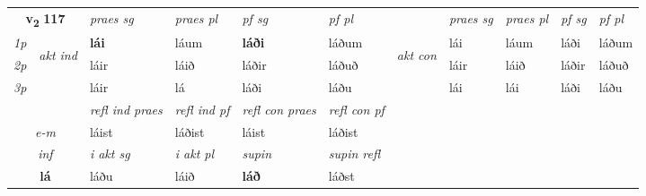 \noindent
\begin{tabular}{lllllllllll} \toprule
\multicolumn{2}{c}{\textbf{v{\textsubscript{2}}} \Large{\textbf{117}}}  &  \textit{praes sg}  & \textit{praes pl}  &\textit{ pf sg} & \textit{pf pl} &  &  \textit{praes sg}  & \textit{praes pl}  & \textit{pf sg} & \textit{pf pl } \\*
	\cmidrule{3-6} \cmidrule{8-11}
 {\textit{1p}} & \multirow{3}{*}{\begin{turn}{90}\textit{akt ind}\end{turn}} & \textbf{lái} & láum & \textbf{láði} & láðum & \multirow{3}{*}{\begin{turn}{90}\textit{akt con}\end{turn}} &lái & láum & láði & láðum\\*
 {\textit{2p}} &  &  láir  & láið & láðir & láðuð & & láir & láið & láðir & láðuð \\*
{\textit{3p}} &  & láir & lá & láði & láðu & & lái & lái& láði & láðu \\*
\cmidrule{3-6} \cmidrule{8-11}

 & & \textit{refl ind praes} & \textit{refl ind pf} & \textit{refl con praes} & \textit{refl con pf} \\*
 \multicolumn{2}{c}{ \textit{e-m} }& láist & láðist & láist & láðist \\*

\cmidrule{3-6}
   \multicolumn{2}{c}{\textit{inf}}  & \textit{i akt sg} & \textit{i akt pl}    & \textit{supin} & \textit{supin refl}  \\*
  \multicolumn{2}{c}{\textbf{lá}} & láðu  & láið    &  \textbf{láð} & láðst  \\*
\end{tabular}

